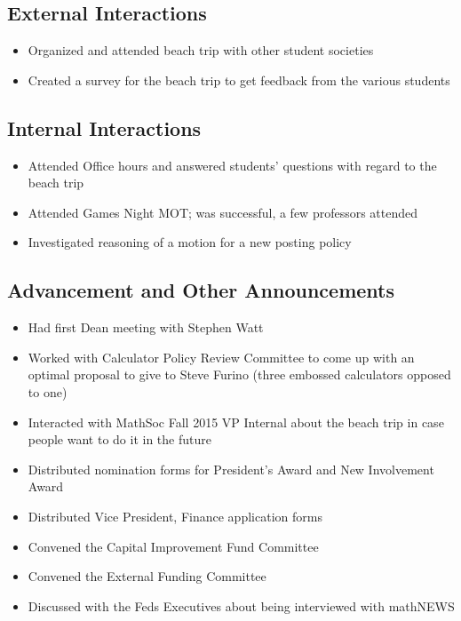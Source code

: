 \subsection*{External Interactions}
\begin{itemize}
	\item Organized and attended beach trip with other student societies
	\item Created a survey for the beach trip to get feedback from the various students
\end{itemize}

\subsection*{Internal Interactions}
\begin{itemize}
	\item Attended Office hours and answered students’ questions with regard to the beach trip
	\item Attended Games Night MOT; was successful, a few professors attended
	\item Investigated reasoning of a motion for a new posting policy
\end{itemize}


\subsection*{Advancement and Other Announcements}
\begin{itemize}
	\item Had first Dean meeting with Stephen Watt
	\item Worked with Calculator Policy Review Committee to come up with an optimal proposal to give to Steve Furino (three embossed calculators opposed to one)
	\item Interacted with MathSoc Fall 2015 VP Internal about the beach trip in case people want to do it in the future
	\item Distributed nomination forms for President's Award and New Involvement Award
	\item Distributed Vice President, Finance application forms
	\item Convened the Capital Improvement Fund Committee
	\item Convened the External Funding Committee
	\item Discussed with the Feds Executives about being interviewed with mathNEWS
\end{itemize}

